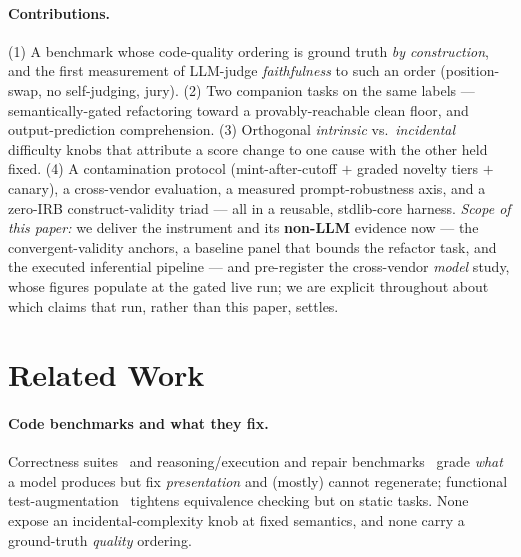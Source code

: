 \documentclass[11pt]{article}
\begin{document}
\paragraph{Contributions.} (1) A benchmark whose code-quality ordering is ground truth
\emph{by construction}, and the first measurement of LLM-judge \emph{faithfulness} to
such an order (position-swap, no self-judging, jury). (2) Two companion tasks on the same
labels --- semantically-gated refactoring toward a provably-reachable clean floor, and
output-prediction comprehension. (3) Orthogonal \emph{intrinsic} vs.\ \emph{incidental}
difficulty knobs that attribute a score change to one cause with the other held fixed.
(4) A contamination protocol (mint-after-cutoff $+$ graded novelty tiers $+$ canary), a
cross-vendor evaluation, a measured prompt-robustness axis, and a zero-IRB
construct-validity triad --- all in a reusable, stdlib-core harness. \emph{Scope of this
paper:} we deliver the instrument and its \textbf{non-LLM} evidence now --- the
convergent-validity anchors, a baseline panel that bounds the refactor task, and the
executed inferential pipeline --- and pre-register the cross-vendor \emph{model} study,
whose figures populate at the gated live run; we are explicit throughout about which
claims that run, rather than this paper, settles.

\section{Related Work}
\paragraph{Code benchmarks and what they fix.} Correctness
suites~\citep{chen-etal-2021-evaluating,austin-etal-2021-program,zhuo-etal-2024-bigcodebench} and
reasoning/execution and repair
benchmarks~\citep{gu-etal-2024-cruxeval,jimenez-etal-2024-swe,gautam-etal-2025-refactorbench} grade
\emph{what} a model produces but fix \emph{presentation} and (mostly) cannot regenerate;
functional test-augmentation~\citep{liu-etal-2023-code} tightens equivalence checking but on
static tasks. None expose an incidental-complexity knob at fixed semantics, and none carry
a ground-truth \emph{quality} ordering.
\end{document}
